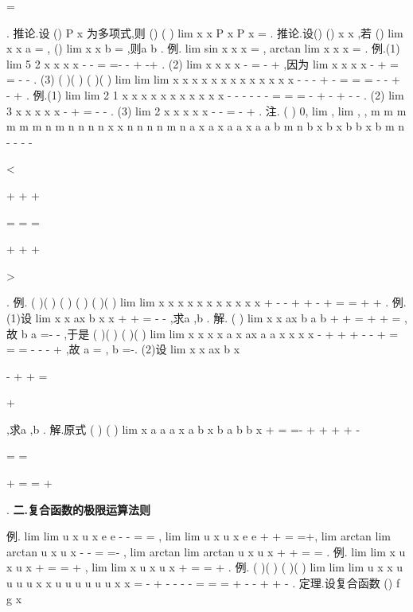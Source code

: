 =






\Omega 
\Omega 
. 
\textcolor{lyred}{推论}.设
()
P x 为多项式,则
()
(
)
lim
x
x P x
P x
\to 
=
. 
\textcolor{lyred}{推论}.设()
()
x
x
\varphi 
\zeta 
\ge 
,若
()
lim
x
x
a
\varphi 
\to 
=
\Omega 
,
()
lim
x
x
b
\zeta 
\to 
=
\Omega 
,则a
b
\ge 
. 
\textcolor{lyred}{例}.
lim sin
x
x
x
\to 
=
,
arctan
lim
x
x
x
\to \infty 
=
. 
\textcolor{lyred}{例}.(1)
lim
5 2
x
x
x
x
\to 
-
-
=
=-
-
+
-\cdots +
. 
(2)
lim
x
x
x
x
\to 
-
=\infty 
-
+
,因为
lim
x
x
x
x
\to 
-
+
=
=
-
-
. 
(3)
(
)(
)
(
)(
)
lim
lim
lim
x
x
x
x
x
x
x
x
x
x
x
x
x
\to 
\to 
\to 
-
-
-
+
-
=
=
=
-
-
+
-
+
. 
\textcolor{lyred}{例}.(1)
lim
lim
2 1
x
x
x
x
x
x
x
x
x
x
x
\to \infty 
\to \infty 
-
-
-
-
-
-
=
=
=
-
+
-
+
-
-
. 
(2)
lim 3
x
x
x
x
x
\to \infty 
-
+
=\infty 
-
-
. 
(3)
lim 2
x
x
x
x
x
\to \infty 
-
-
=
-
+
. 
\textcolor{lyred}{注}.
(
)
0,
lim
,
lim
,
,
m
m
m
m
m
m
n
m
n
n
n
n
x
x
n
n
n
n
m
n
a x
a
x
a
a x
a
a
b
m
n
b x
b
x
b
b x
b
m
n
-
-
-
\to \infty 
\to \infty 
-

<

+
+
+

\neq 
=
=
=

+
+
+

\infty 
>

\Lambda 
\Lambda 
. 
\textcolor{lyred}{例}.
(
)(
)
(
)
(
)
(
)(
)
lim
lim
x
x
x
x
x x
x
x
x
x
x
\to \infty 
\to \infty 
+
-
-
+
+
-
+
=
=
+
+
\Lambda 
\Lambda 
\Lambda 
. 
\textcolor{lyred}{例}.(1)设
lim
x
x
ax
b
x
x
\to 
+
+
=
-
-
,求a ,b . 
解.
(
)
lim
x
x
ax
b
a
b
\to 
+
+
=
+
+
=
,故
b
a
=-
-
,于是 
(
)(
)
(
)(
)
lim
lim
x
x
x
x
a
x
ax
a
a
x
x
x
x
\to 
\to 
-
+
+
+
-
-
+
=
=
=
-
-
-
+
,故
a =
,
b =-. 
(2)设
lim
x
x
ax
b
x
\to \infty 


-
+
+
=


+


,求a ,b . 
解.原式
(
)
(
)
lim
x
a
a
a x
a
b x
b
a
b
b
x
\to \infty 
+
=
=-
+
+
+
+
-


=
=
\Rightarrow 
\Rightarrow 


+
=
=
+


. 
\vspace{4pt}
{\bfseries \textcolor{lyred}{二.复合函数的极限运算法则}}

\textcolor{lyred}{例}.
lim
lim
u
x
u
x
e
e
-
\to -\infty 
\to 
=
=
,
lim
lim
u
x
u
x
e
e
+
\to +\infty 
\to 
=
=+\infty , 
lim arctan
lim arctan
u
x
u
x
\pi 
-
\to -\infty 
\to 
=
=-
,
lim arctan
lim arctan
u
x
u
x
\pi 
+
\to +\infty 
\to 
=
=
. 
\textcolor{lyred}{例}.
lim
lim
x
u
x
u
x
\to 
\to 
+
=
=
+
,
lim
lim
x
u
x
u
x
\to \infty 
\to 
+
=
=
+
. 
\textcolor{lyred}{例}.
(
)(
)
(
)(
)
lim
lim
lim
u
x
x
u
u
u
u
x
x
u
u
u
u
u
u
x
x
=
\to 
\to 
\to 
-
+
-
-
-
-
=
=
=
+
-
-
+
+
-
. 
\textcolor{lyred}{定理}.设复合函数
()
f
g x



